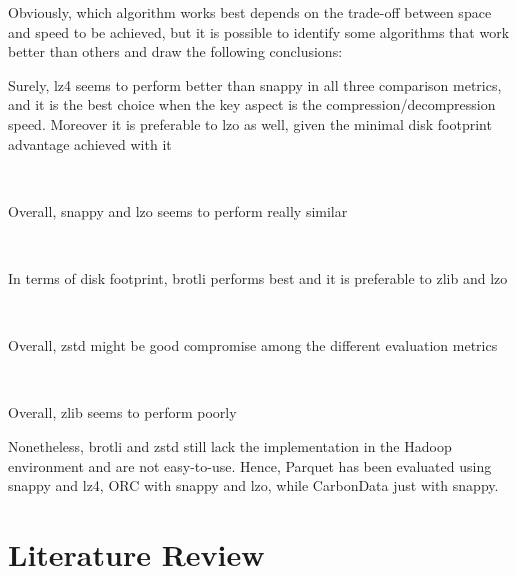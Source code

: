 \documentclass[10pt, a4paper]{report}
\begin{document}
Obviously, which algorithm works best depends on the trade-off between space and speed to be achieved, but it is possible to identify some algorithms that work better than others and draw the following conclusions: \\

\begin{itemize}
	\begin{minipage}{0.92\textwidth}
		\item Surely, lz4 seems to perform better than snappy in all three comparison metrics, and it is the best choice when the key aspect is the compression/decompression speed. Moreover it is preferable to lzo as well, given the minimal disk footprint advantage achieved with it \\
	\end{minipage} \\
	\begin{minipage}{0.92\textwidth}
		\item Overall, snappy and lzo seems to perform really similar \\
	\end{minipage} \\
	\begin{minipage}{0.92\textwidth}
		\item In terms of disk footprint, brotli performs best and it is preferable to zlib and lzo \\
	\end{minipage} \\
	\begin{minipage}{0.92\textwidth}
		\item Overall, zstd might be good compromise among the different evaluation metrics \\
	\end{minipage} \\
	\begin{minipage}{0.92\textwidth}
		\item Overall, zlib seems to perform poorly \\
	\end{minipage}
\end{itemize}

Nonetheless, brotli and zstd still lack the implementation in the Hadoop environment and are not easy-to-use. Hence, Parquet has been evaluated using snappy and lz4, ORC with snappy and lzo, while CarbonData just with snappy.

\chapter{Literature Review}
\end{document}
